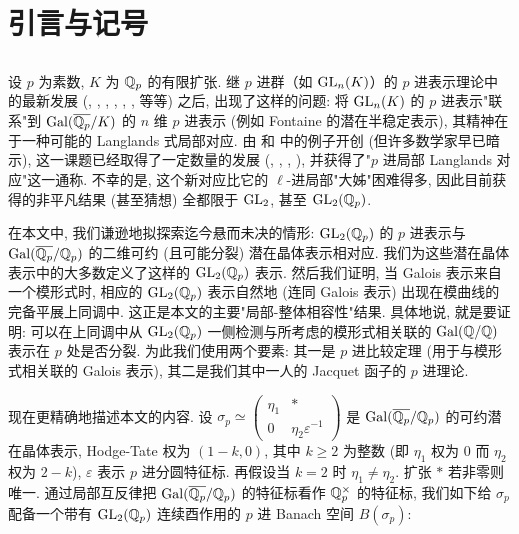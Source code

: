 
\section{引言与记号}

\subsection{\mbox{}}

设 $p$ 为素数, $K$ 为 $\mathbb{Q}_p$ 的有限扩张.
继 $p$ 进群（如 $\mathrm{GL}_n(K)$）的 $p$ 进表示理论中的最新发展 (\cite{ref:44}, \cite{ref:43}, \cite{ref:45}, \cite{ref:22}, \cite{ref:25}, \cite{ref:26}, 等等) 之后, 出现了这样的问题: 将 $\mathrm{GL}_n(K)$ 的 $p$ 进表示"联系"到 $\operatorname{Gal}(\overline{\mathbb{Q}_p}/K)$ 的 $n$ 维 $p$ 进表示 (例如 Fontaine 的潜在半稳定表示), 其精神在于一种可能的 Langlands 式局部对应.
由 \cite{ref:7} 和 \cite{ref:8} 中的例子开创 (但许多数学家早已暗示), 这一课题已经取得了一定数量的发展 (\cite{ref:9}, \cite{ref:18}, \cite{ref:3}, \cite{ref:19}), 并获得了"$p$ 进局部 Langlands 对应"这一通称.
不幸的是, 这个新对应比它的 $\ell$-进局部"大姊"困难得多, 因此目前获得的非平凡结果 (甚至猜想) 全都限于 $\mathrm{GL}_2$, 甚至 $\mathrm{GL}_2(\mathbb{Q}_p)$.

在本文中, 我们谦逊地拟探索迄今悬而未决的情形: $\mathrm{GL}_2(\mathbb{Q}_p)$ 的 $p$ 进表示与 $\operatorname{Gal}(\overline{\mathbb{Q}_p}/\mathbb{Q}_p)$ 的二维可约 (且可能分裂) 潜在晶体表示相对应.
我们为这些潜在晶体表示中的大多数定义了这样的 $\mathrm{GL}_2(\mathbb{Q}_p)$ 表示.
然后我们证明, 当 Galois 表示来自一个模形式时, 相应的 $\mathrm{GL}_2(\mathbb{Q}_p)$ 表示自然地 (连同 Galois 表示) 出现在模曲线的完备平展上同调中.
这正是本文的主要"局部-整体相容性"结果.
具体地说, 就是要证明: 可以在上同调中从 $\mathrm{GL}_2(\mathbb{Q}_p)$ 一侧检测与所考虑的模形式相关联的 $\operatorname{Gal}(\mathbb{Q}/\mathbb{Q})$ 表示在 $p$ 处是否分裂.
为此我们使用两个要素: 其一是 $p$ 进比较定理 (用于与模形式相关联的 Galois 表示), 其二是我们其中一人的 Jacquet 函子的 $p$ 进理论.

现在更精确地描述本文的内容.
设 $\sigma_p \simeq \begin{pmatrix} \eta_1 & * \\ 0 & \eta_2 \varepsilon^{-1} \end{pmatrix}$ 是 $\operatorname{Gal}(\overline{\mathbb{Q}_p}/\mathbb{Q}_p)$ 的可约潜在晶体表示, Hodge-Tate 权为 $(1-k,0)$, 其中 $k \ge 2$ 为整数 (即 $\eta_1$ 权为 $0$ 而 $\eta_2$ 权为 $2-k$), $\varepsilon$ 表示 $p$ 进分圆特征标.
再假设当 $k = 2$ 时 $\eta_1 \neq \eta_2$.
扩张 $*$ 若非零则唯一.
通过局部互反律把 $\operatorname{Gal}(\overline{\mathbb{Q}_p}/\mathbb{Q}_p)$ 的特征标看作 $\mathbb{Q}_p^{\times}$ 的特征标, 我们如下给 $\sigma_p$ 配备一个带有 $\mathrm{GL}_2(\mathbb{Q}_p)$ 连续酉作用的 $p$ 进 Banach 空间 $B(\sigma_p)$:

